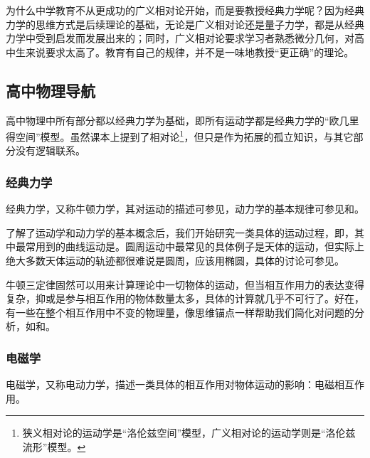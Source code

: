 为什么中学教育不从更成功的广义相对论开始，而是要教授经典力学呢？因为经典力学的思维方式是后续理论的基础，无论是广义相对论还是量子力学，都是从经典力学中受到启发而发展出来的；同时，广义相对论要求学习者熟悉微分几何，对高中生来说要求太高了。教育有自己的规律，并不是一味地教授“更正确”的理论。





\subsection{高中物理导航}


高中物理中所有部分都以经典力学为基础，即所有运动学都是经典力学的“欧几里得空间”模型。虽然课本上提到了相对论\footnote{狭义相对论的运动学是“洛伦兹空间”模型，广义相对论的运动学则是“洛伦兹流形”模型。}，但只是作为拓展的孤立知识，与其它部分没有逻辑联系。




\subsubsection{经典力学}

经典力学，又称牛顿力学，其对运动的描述可参见，动力学的基本规律可参见和。

了解了运动学和动力学的基本概念后，我们开始研究一类具体的运动过程，即，其中最常用到的曲线运动是。圆周运动中最常见的具体例子是天体的运动，但实际上绝大多数天体运动的轨迹都很难说是圆周，应该用椭圆，具体的讨论可参见。


牛顿三定律固然可以用来计算理论中一切物体的运动，但当相互作用力的表达变得复杂，抑或是参与相互作用的物体数量太多，具体的计算就几乎不可行了。好在，有一些在整个相互作用中不变的物理量，像思维锚点一样帮助我们简化对问题的分析，如和。




\subsubsection{电磁学}


电磁学，又称电动力学，描述一类具体的相互作用对物体运动的影响：电磁相互作用。
























